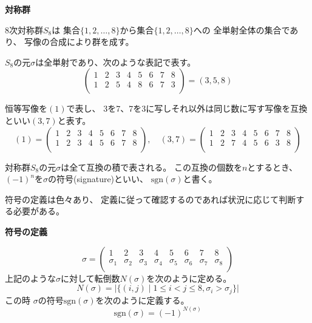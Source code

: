 \documentclass[12pt,b5paper]{ltjsarticle}
\begin{document}
\textbf{対称群}

8次対称群$S_{8}$は
集合$\{1,2,\dots,8\}$から集合$\{1,2,\dots,8\}$への
全単射全体の集合であり、
写像の合成により群を成す。

$S_{8}$の元$\sigma$は全単射であり、次のような表記で表す。
\begin{equation}
 \begin{pmatrix}
  1&2&3&4&5&6&7&8\\
  1&2&5&4&8&6&7&3\\
 \end{pmatrix}
 =(3,5,8)
\end{equation}

恒等写像を$(1)$で表し、
3を7、7を3に写しそれ以外は同じ数に写す写像を互換といい$(3,7)$と表す。
\begin{equation}
 (1)=
 \begin{pmatrix}
  1&2&3&4&5&6&7&8\\
  1&2&3&4&5&6&7&8\\
 \end{pmatrix}
 ,\quad
 (3,7)=
 \begin{pmatrix}
  1&2&3&4&5&6&7&8\\
  1&2&7&4&5&6&3&8\\
 \end{pmatrix}
\end{equation}

対称群$S_{8}$の元$\sigma$は全て互換の積で表される。
この互換の個数を$n$とするとき、
$(-1)^n$を$\sigma$の符号(signature)といい、
$\mathrm{sgn}(\sigma)$と書く。

符号の定義は色々あり、
定義に従って確認するのであれば状況に応じて判断する必要がある。

\textbf{符号の定義}

\begin{equation}
 \sigma =
  \begin{pmatrix}
   1&2&3&4&5&6&7&8\\
   \sigma_1 & \sigma_2 & \sigma_3 & \sigma_4 & \sigma_5 & \sigma_6 & \sigma_7 & \sigma_8\\
  \end{pmatrix}
\end{equation}
上記のような$\sigma$に対して転倒数$N(\sigma)$を次のように定める。
\begin{equation}
 N(\sigma) = \lvert \{(i,j) \mid 1\leq i<j \leq 8 , \sigma_i>\sigma_j \} \rvert
\end{equation}
この時 $\sigma$の符号$\mathrm{sgn}(\sigma)$を次のように定義する。
\begin{equation}
 \mathrm{sgn}(\sigma)=(-1)^{N(\sigma)}
\end{equation}
\end{document}
